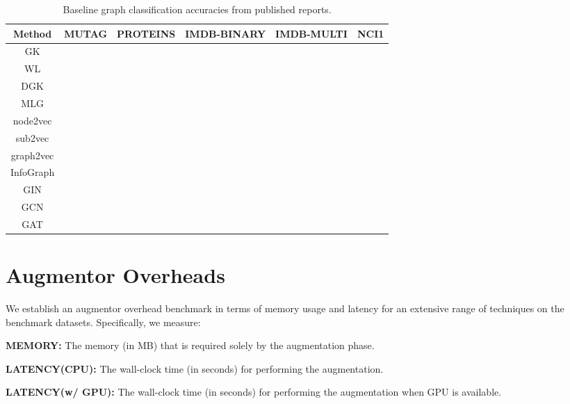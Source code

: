 \documentclass{article}
\theoremstyle{plain}
\theoremstyle{definition}
\theoremstyle{remark}
\begin{document}
\begin{table*}[ht!]
\centering
\caption{Baseline graph classification accuracies from published reports. }
\label{table:graph_baselines}
\vskip 0.15in
\begin{center}
\begin{small}
\begin{sc}
\begin{tabular}{c|c|c|c|c|c}
\toprule
Method & MUTAG & PROTEINS & IMDB-BINARY & IMDB-MULTI & NCI1 \\
\midrule
GK &  &  &  &  &  \\
WL &  &  &  &  &  \\
DGK  &  &  &  &  & \\
MLG &  &  &  &  &  \\
\midrule
node2vec  &  &  &  &  &  \\
sub2vec &  &  &  &  &  \\
graph2vec  &  &  &  &  &  \\
InfoGraph &  &  &  &  &  \\
\midrule
GIN &  &  &  &  &  \\
GCN &  &  &  &  &  \\
GAT &  &  &  &  &  \\
\bottomrule
\end{tabular}
\end{sc}
\end{small}
\end{center}
\vskip -0.1in
\end{table*}


\section{Augmentor Overheads}
\label{appendix:aug_overhead}

We establish an augmentor overhead benchmark in terms of memory usage and latency for an extensive range of techniques on the benchmark datasets. Specifically, we measure:

\textbf{MEMORY:} The memory (in MB) that is required solely by the augmentation phase.

\textbf{LATENCY(CPU):} The wall-clock time (in seconds) for performing the augmentation.

\textbf{LATENCY(w/ GPU):} The wall-clock time (in seconds) for performing the augmentation when GPU is available.
\end{document}
